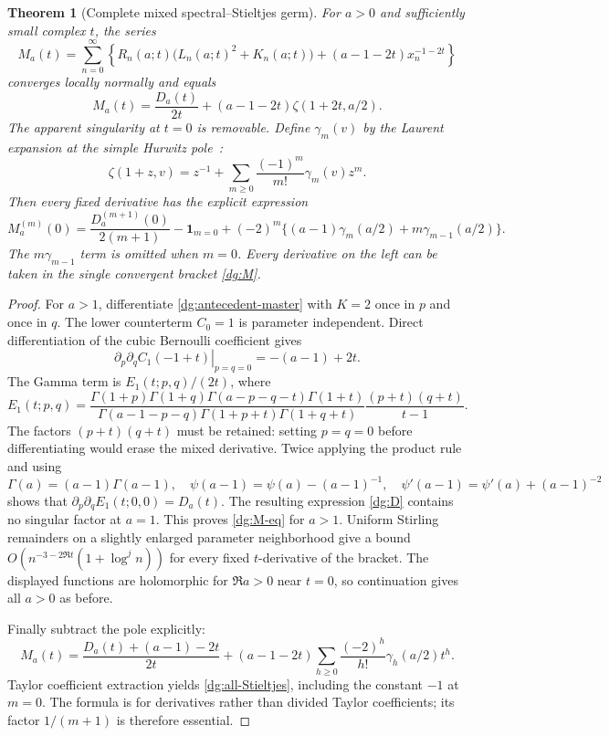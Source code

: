 \documentclass[11pt,a4paper]{article}
\numberwithin{equation}{section}
\newtheorem{theorem}{Theorem}[section]
\theoremstyle{definition}
\theoremstyle{remark}
\begin{document}
\begin{theorem}[Complete mixed spectral--Stieltjes germ]
\label{dg:spectral}
For $a>0$ and sufficiently small complex $t$, the series
\begin{equation}
 M_a(t)=\sum_{n=0}^{\infty}\left\{
 R_n(a;t)\bigl(L_n(a;t)^2+K_n(a;t)\bigr)
 +(a-1-2t)x_n^{-1-2t}\right\}
 \label{dg:M}
\end{equation}
converges locally normally and equals
\begin{equation}
 M_a(t)=\frac{D_a(t)}{2t}
             +(a-1-2t)\zeta(1+2t,a/2).
 \label{dg:M-eq}
\end{equation}
The apparent singularity at $t=0$ is removable. Define $\gamma_m(v)$
by the Laurent expansion at the simple Hurwitz pole~\cite{DLMFHurwitz}:
\[
 \zeta(1+z,v)=z^{-1}+\sum_{m\geq0}\frac{(-1)^m}{m!}\gamma_m(v)z^m.
\]
Then every fixed derivative has the explicit expression
\begin{equation}
 M_a^{(m)}(0)=\frac{D_a^{(m+1)}(0)}{2(m+1)}
 -\mathbf1_{m=0}
 +(-2)^m\{(a-1)\gamma_m(a/2)+m\gamma_{m-1}(a/2)\}.
 \label{dg:all-Stieltjes}
\end{equation}
The $m\gamma_{m-1}$ term is omitted when $m=0$. Every derivative
on the left can be taken in the single convergent bracket
\eqref{dg:M}.
\end{theorem}
\begin{proof}
For $a>1$, differentiate \eqref{dg:antecedent-master} with $K=2$
once in $p$ and once in $q$. The lower counterterm $C_0=1$ is
parameter independent. Direct differentiation of the cubic Bernoulli
coefficient gives
\[
 \left.\partial_p\partial_qC_1(-1+t)\right|_{p=q=0}=-(a-1)+2t.
\]
The Gamma term is $E_1(t;p,q)/(2t)$, where
\[
 E_1(t;p,q)=
 \frac{\Gamma(1+p)\Gamma(1+q)\Gamma(a-p-q-t)\Gamma(1+t)}
 {\Gamma(a-1-p-q)\Gamma(1+p+t)\Gamma(1+q+t)}
                  \frac{(p+t)(q+t)}{t-1}.
\]
The factors $(p+t)(q+t)$ must be retained: setting $p=q=0$
before differentiating would erase the mixed derivative.
Twice applying the product rule and using
\[
 \Gamma(a)=(a-1)\Gamma(a-1),\quad
 \psi(a-1)=\psi(a)-(a-1)^{-1},\quad
 \psi'(a-1)=\psi'(a)+(a-1)^{-2}
\]
shows that $\partial_p\partial_qE_1(t;0,0)=D_a(t)$.
The resulting expression \eqref{dg:D} contains no singular
factor at $a=1$. This proves \eqref{dg:M-eq} for $a>1$.
Uniform Stirling remainders on a slightly enlarged parameter
neighborhood give a bound
$O(n^{-3-2\Re t}(1+\log^j n))$ for every fixed $t$-derivative of
the bracket. The displayed functions are holomorphic for $\Re a>0$
near $t=0$, so continuation gives all $a>0$ as before.

Finally subtract the pole explicitly:
\[
 M_a(t)=\frac{D_a(t)+(a-1)-2t}{2t}
 +(a-1-2t)\sum_{h\geq0}\frac{(-2)^h}{h!}\gamma_h(a/2)t^h.
\]
Taylor coefficient extraction yields
\eqref{dg:all-Stieltjes}, including the constant $-1$ at
$m=0$. The formula is for derivatives rather than divided Taylor
coefficients; its factor $1/(m+1)$ is therefore essential.
\end{proof}
\end{document}
